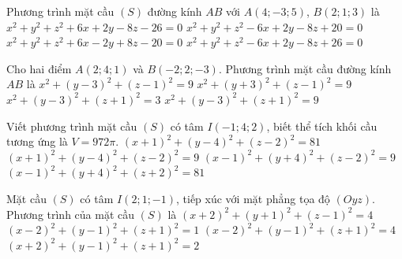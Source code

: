 \begin{ex}%
	Phương trình mặt cầu $\left(S\right)$ đường kính $AB$ với $A\left(4; -3; 5\right)$, $B\left(2; 1; 3\right)$ là
	\choice
	{$x^2 + y^2 + z^2 + 6x + 2y - 8z - 26 = 0$}
	{\True $x^2 + y^2 + z^2 - 6x + 2y - 8z + 20 = 0$}
	{$x^2 + y^2 + z^2 + 6x -  2y + 8z - 20 = 0$}
	{$x^2 + y^2 + z^2 - 6x + 2y - 8z +  26 = 0$}
\end{ex}

\begin{ex}%
	Cho hai điểm $A(2; 4; 1)$ và $B(-2; 2; -3)$. Phương trình mặt cầu đường kính $AB$ là
	\choice
	{$x^2+(y-3)^2+(z-1)^2=9$}
	{$x^2+(y+3)^2+(z-1)^2=9$}
	{$x^2+(y-3)^2+(z+1)^2=3$}
	{\True $x^2+(y-3)^2+(z+1)^2=9$}
\end{ex}



\begin{ex}%
	Viết phương trình mặt cầu $(S)$ có tâm $I(-1;4;2)$, biết thể tích khối cầu tương ứng là $V=972\pi$.
	\choice
	{\True $(x+1)^2+(y-4)^2+(z-2)^2=81$}
	{$(x+1)^2+(y-4)^2+(z-2)^2=9$}
	{$(x-1)^2+(y+4)^2+(z-2)^2=9$}
	{$(x-1)^2+(y+4)^2+(z+2)^2=81$}
\end{ex}

\begin{ex}%
	Mặt cầu $(S)$ có tâm $I(2; 1; -1)$, tiếp xúc với mặt phẳng tọa độ $(Oyz)$. Phương trình của mặt cầu $(S)$ là
	\choice
	{$(x+2)^2+(y+1)^2+(z-1)^2=4$}
	{$(x-2)^2+(y-1)^2+(z+1)^2=1$}
	{\True $(x-2)^2+(y-1)^2+(z+1)^2=4$}
	{$(x+2)^2+(y-1)^2+(z+1)^2=2$}
\end{ex}

